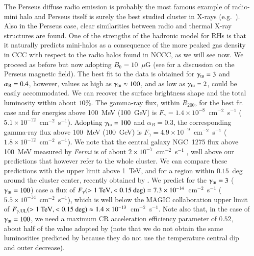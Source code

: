 \documentclass[traditabstract]{aa}
\begin{document}
The Perseus diffuse radio emission is probably the most famous example of radio-mini halo \citep{1990MNRAS.246..477P} and Perseus itself is surely the best studied cluster in X-rays (e.g.~\citealp{2003ApJ...590..225C,2006MNRAS.366..417F,2011arXiv1105.5025F}). Also in the Perseus case, clear similarities between radio and thermal X-ray structures are found. One of the strengths of the hadronic model for RHs is that it naturally predicts mini-halos as a consequence of the more peaked gas density in CCC with respect to the radio halos found in NCCC, as we will see now. 
We proceed as before but now adopting $B_{0}=10$~$\mu$G (see \citealp{2010ApJ...710..634A,2011arXiv1111.5544M} for a discussion on the Perseus magnetic field). 
The best fit to the data is obtained for $\gamma_{\rm{tu}}=3$ and $\alpha_{\rm{B}}=0.4$, however, values as high as $\gamma_{\rm{tu}} \approx 100$, and as low as $\gamma_{\rm{tu}}=2$, could be easily accommodated. We can recover the surface brightness shape and the total luminosity within about $10\%$. The gamma-ray flux, within $R_{200}$, for the best fit case and for energies above 100~MeV (100~GeV) is $F_{\gamma} = 1.4 \times 10^{-8}$~cm$^{-2}$~s$^{-1}$ ($5.1 \times 10^{-12}$~cm$^{-2}$~s$^{-1}$). Adopting $\gamma_{\rm{tu}}=100$ and $\alpha_B=0.3$, the corresponding gamma-ray flux above 100~MeV (100~GeV) is $F_{\gamma} = 4.9 \times 10^{-9}$~cm$^{-2}$~s$^{-1}$ ($1.8 \times 10^{-12}$~cm$^{-2}$~s$^{-1}$). We note that the central galaxy NGC~1275 flux above 100~MeV measured by \emph{Fermi} is of about $2 \times 10^{-7}$~cm$^{-2}$~s$^{-1}$ \citep{2009arXiv0904.1904T}, well above our predictions that however refer to the whole cluster. We can compare these predictions with the upper limit above 1~TeV, and for a region within $0.15$~deg around the cluster center, recently obtained by \cite{2011arXiv1111.5544M}. We predict for the $\gamma_{\rm{tu}}=3$ ($\gamma_{\rm{tu}}=100$) case a flux of $F_{\gamma}(>1~\rm{TeV},<0.15~\rm{deg}) = 7.3 \times 10^{-14}$~cm$^{-2}$~s$^{-1}$ ($5.5 \times 10^{-14}$~cm$^{-2}$~s$^{-1}$), which is well below the MAGIC collaboration upper limit of $F_{\gamma,\rm{UL}}(>1~\rm{TeV},<0.15~\rm{deg}) \approx 1.4 \times 10^{-13}$~cm$^{-2}$~s$^{-1}$. Note also that, in the case of $\gamma_{\rm{tu}} = 100$, we need a maximum CR acceleration efficiency parameter of $0.52$, about half of the value adopted by \cite{2010MNRAS.409..449P} (note that we do not obtain the same luminosities predicted by \cite{2010MNRAS.409..449P} because they do not use the temperature central dip and outer decrease).
\end{document}
